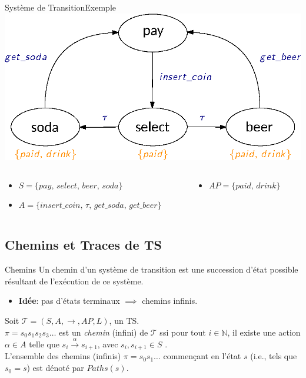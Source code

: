 \documentclass[compress]{beamer}
\begin{document}
\begin{frame}{Système de Transition}{Exemple}
    \centering
    \includegraphics[width=0.7\linewidth]{resources/TS.eps}
    \scriptsize
    \begin{columns}
      \begin{column}{0.65\textwidth}
        \begin{itemize}
          \item $ S = \{ pay, \, select, \, beer, \, soda \}$
          \item $ A = \{ insert\_coin,\, \tau,\, get\_soda,\, get\_beer\}$
        \end{itemize}
      \end{column}
      \begin{column}{0.35\textwidth}
        \begin{itemize}
          \item $AP = \{ paid, \, drink \}$
        \end{itemize}
      \end{column}
    \end{columns}
\end{frame}

\subsection{Chemins et Traces de TS}
\begin{frame}{Chemins}
Un chemin d'un système de transition est une succession d'état possible résultant de l'exécution de ce système.
\begin{itemize}
  \item \textbf{\color{fibeamer@orange}Idée}: pas d'états terminaux $\implies$
    chemins infinis.
\end{itemize}
\begin{definition}[Chemin d'un TS]
  Soit $\mathcal{T} = (S, A, \rightarrow, AP, L)$, un TS. \\
  $\pi = s_0 s_1 s_2 s_3 \dots$ est un \textit{chemin} (infini) de $\mathcal{T}$ ssi
  pour tout $i \in \mathbb{N}$, il existe une action $\alpha \in A$ telle que
  $s_i \xrightarrow{\alpha} s_{i+1}$, avec $s_i, s_{i+1} \in S$%
  . \\
  L'ensemble des chemins (infinis) $\pi = s_0s_1\dots$ commençant en l'état $s$ (i.e., tels que $s_0 = s$) est dénoté par $Paths(s)$.

\end{definition}

\end{frame}
\end{document}
